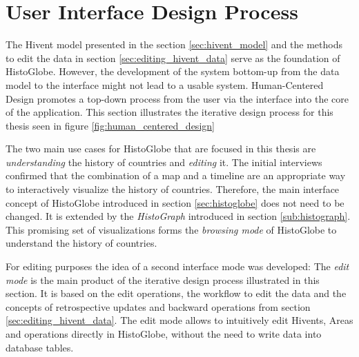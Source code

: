 
\section{User Interface Design Process} %
\label{sec:user_interface_design_process}

The Hivent model presented in the section \ref{sec:hivent_model} and the methods to edit the data in section \ref{sec:editing_hivent_data} serve as the foundation of HistoGlobe. However, the development of the system bottom-up from the data model to the interface might not lead to a usable system. Human-Centered Design promotes a top-down process from the user via the interface into the core of the application. This section illustrates the iterative design process for this thesis seen in figure \ref{fig:human_centered_design}

The two main use cases for HistoGlobe that are focused in this thesis are \emph{understanding} the history of countries and \emph{editing} it. The initial interviews confirmed that the combination of a map and a timeline are an appropriate way to interactively visualize the history of countries. Therefore, the main interface concept of HistoGlobe introduced in section \ref{sec:histoglobe} does not need to be changed. It is extended by the \emph{HistoGraph} introduced in section \ref{sub:histograph}. This promising set of visualizations forms the \emph{browsing mode} of HistoGlobe to understand the history of countries.

For editing purposes the idea of a second interface mode was developed: The \emph{edit mode} is the main product of the iterative design process illustrated in this section. It is based on the edit operations, the workflow to edit the data and the concepts of retrospective updates and backward operations from section \ref{sec:editing_hivent_data}. The edit mode allows to intuitively edit Hivents, Areas and operations directly in HistoGlobe, without the need to write data into database tables.



